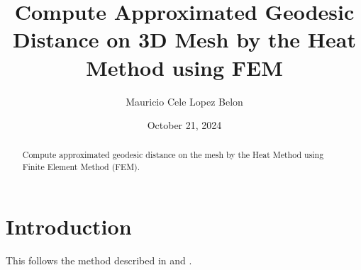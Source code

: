 \documentclass{birkjour}
\numberwithin{equation}{section}
\begin{document}
%
%
%
%
%
%
%
%
%


\title[Compute Approximated Geodesic Distance on 3D Mesh by the Heat Method using FEM]
 {Compute Approximated Geodesic Distance on 3D Mesh by the Heat Method using FEM}

\author[Mauricio Cele Lopez Belon]{Mauricio Cele Lopez Belon}
\address{Madrid, Spain}



\date{October 21, 2024}

\begin{abstract}

Compute approximated geodesic distance on the mesh by the Heat Method using Finite Element Method (FEM).

\end{abstract}

\maketitle
\section{Introduction}


This follows the method described in \cite{Sayas2015} and \cite{Langtangen2014}.
\end{document}
